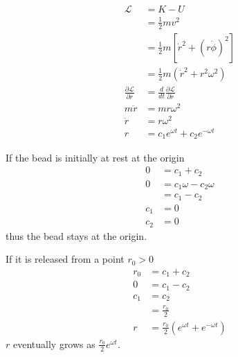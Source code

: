 \documentclass{article}
\begin{document}
\setcounter{subsection}{20}
\subsection{}

\begin{align*}
  \mathcal{L}                             & = K - U                                                       \\
                                          & = \frac{1}{2} m v^2                                           \\
                                          & = \frac{1}{2} m [\dot{r}^2 + (r \dot{\phi})^2]                \\
                                          & = \frac{1}{2} m (\dot{r}^2 + r^2 \omega^2)                    \\
  \frac{\partial \mathcal{L}}{\partial r} & = \frac{d}{d t} \frac{\partial \mathcal{L}}{\partial \dot{r}} \\
  m \ddot{r}                              & = m r \omega^2                                                \\
  \ddot{r}                                & = r \omega^2                                                  \\
  r                                       & = c_1 e^{\omega t} + c_2 e^{-\omega t}
\end{align*}

If the bead is initially at rest at the origin
\begin{align*}
  0   & = c_1 + c_2               \\
  0   & = c_1 \omega - c_2 \omega \\
      & = c_1 - c_2               \\
  c_1 & = 0                       \\
  c_2 & = 0
\end{align*}
thus the bead stays at the origin.

If it is released from a point $r_0 > 0$
\begin{align*}
  r_0 & = c_1 + c_2                                    \\
  0   & = c_1 - c_2                                    \\
  c_1 & = c_2                                          \\
      & = \frac{r_0}{2}                                \\
  r   & = \frac{r_0}{2} (e^{\omega t} + e^{-\omega t})
\end{align*}
$r$ eventually grows as $\frac{r_0}{2} e^{\omega t}$.
\end{document}
